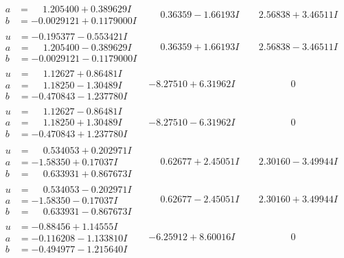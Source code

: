 \documentclass[1p]{elsarticle_modified}
\theoremstyle{definition}
\begin{document}
$$\begin{array}{c|c|c}
\begin{aligned}
a &= \phantom{-}1.205400 + 0.389629 I \\
b &= -0.0029121 + 0.1179000 I\end{aligned}
 & \phantom{-}0.36359 - 1.66193 I & \phantom{-}2.56838 + 3.46511 I \\ \hline\begin{aligned}
u &= -0.195377 - 0.553421 I \\
a &= \phantom{-}1.205400 - 0.389629 I \\
b &= -0.0029121 - 0.1179000 I\end{aligned}
 & \phantom{-}0.36359 + 1.66193 I & \phantom{-}2.56838 - 3.46511 I \\ \hline\begin{aligned}
u &= \phantom{-}1.12627 + 0.86481 I \\
a &= \phantom{-}1.18250 - 1.30489 I \\
b &= -0.470843 - 1.237780 I\end{aligned}
 & -8.27510 + 6.31962 I & \phantom{-0.000000 } 0 \\ \hline\begin{aligned}
u &= \phantom{-}1.12627 - 0.86481 I \\
a &= \phantom{-}1.18250 + 1.30489 I \\
b &= -0.470843 + 1.237780 I\end{aligned}
 & -8.27510 - 6.31962 I & \phantom{-0.000000 } 0 \\ \hline\begin{aligned}
u &= \phantom{-}0.534053 + 0.202971 I \\
a &= -1.58350 + 0.17037 I \\
b &= \phantom{-}0.633931 + 0.867673 I\end{aligned}
 & \phantom{-}0.62677 + 2.45051 I & \phantom{-}2.30160 - 3.49944 I \\ \hline\begin{aligned}
u &= \phantom{-}0.534053 - 0.202971 I \\
a &= -1.58350 - 0.17037 I \\
b &= \phantom{-}0.633931 - 0.867673 I\end{aligned}
 & \phantom{-}0.62677 - 2.45051 I & \phantom{-}2.30160 + 3.49944 I \\ \hline\begin{aligned}
u &= -0.88456 + 1.14555 I \\
a &= -0.116208 - 1.133810 I \\
b &= -0.494977 - 1.215640 I\end{aligned}
 & -6.25912 + 8.60016 I & \phantom{-0.000000 } 0\\

\end{array}$$
\end{document}
